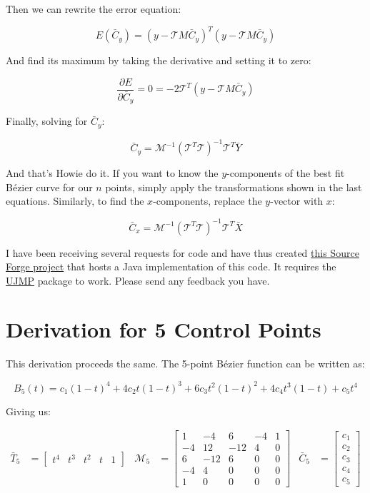 \documentclass{article}
\begin{document}
Then we can rewrite the error equation:

\[E(\bar{C}_y)=(y-\mathcal{T}M\bar{C}_y)^T(y-\mathcal{T}M\bar{C}_y)\]

And find its maximum by taking the derivative and setting it to zero:

\[\frac{\partial E}{\partial \bar{C}_y} = 0 = -2\mathcal{T}^T(y-\mathcal{T}M\bar{C}_y)\]

Finally, solving for $\bar{C}_y$:

\[\bar{C}_y = \mathcal{M}^{-1}(\mathcal{T}^T\mathcal{T})^{-1}\mathcal{T}^T\bar{Y}\]

And that's Howie do it.  If you want to know the $y$-components of the best fit B\'ezier curve for our $n$ points, simply apply the transformations shown in the last equations. Similarly, to find the $x$-components, replace the $y$-vector with $x$:

\[\bar{C}_x = \mathcal{M}^{-1}(\mathcal{T}^T\mathcal{T})^{-1}\mathcal{T}^T\bar{X}\]

I have been receiving several requests for code and have thus created \href{http://sourceforge.net/projects/lsbezier/}{this Source Forge project} that hosts a Java implementation of this code.  It requires the \href{http://sourceforge.net/projects/ujmp/}{UJMP} package to work. Please send any feedback you have.

\section{Derivation for 5 Control Points}

This derivation proceeds the same.  The 5-point B\'ezier function can be written as:

\[B_5(t) = c_1(1-t)^4 + 4c_2t(1-t)^3 + 6c_3t^2(1-t)^2 + 4c_4t^3(1-t) + c_5t^4\]

Giving us:

\begin{align*}
\bar{T}_5 &= \left[\begin{array}{ccccc}t^4 & t^3 & t^2 & t & 1\end{array}\right] &
  \mathcal{M}_5 &= \left[
    \begin{array}{rrrrr}
       1 & - 4 &   6 & -4 & 1 \\
      -4 &  12 & -12 &  4 & 0 \\
       6 & -12 &   6 &  0 & 0 \\
      -4 &   4 &   0 &  0 & 0 \\
       1 &   0 &   0 &  0 & 0
    \end{array}
  \right] &
  \bar{C}_5 &= \left[\begin{array}{r}c_1\\c_2\\c_3\\c_4\\c_5\end{array}\right]
\end{align*}
\end{document}
